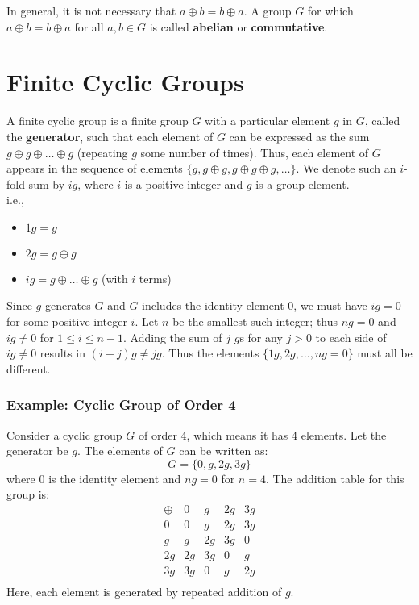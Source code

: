 \documentclass[11pt, letterpaper]{article}
\begin{document}
In general, it is not necessary that \( a \oplus b = b \oplus a \). A group \( G \) for which \( a \oplus b = b \oplus a \) for all \( a, b \in G \) is called \textbf{abelian} or \textbf{commutative}.






\section{Finite Cyclic Groups}

A finite cyclic group is a finite group \( G \) with a particular element \( g \) in \( G \), called the \textbf{generator}, such that each element of \( G \) can be expressed as the sum \( g \oplus g \oplus \ldots \oplus g \) (repeating \( g \) some number of times). Thus, each element of \( G \) appears in the sequence of elements \(\{g, g \oplus g, g \oplus g \oplus g, \ldots\}\). We denote such an \( i \)-fold sum by \( ig \), where \( i \) is a positive integer and \( g \) is a group element.
\\
i.e.,

\begin{itemize}
    \item \( 1g = g \)
    \item \( 2g = g \oplus g \)
    \item \( ig = g \oplus \ldots \oplus g \) (with \( i \) terms)
\end{itemize}

Since \( g \) generates \( G \) and \( G \) includes the identity element \( 0 \), we must have \( ig = 0 \) for some positive integer \( i \). Let \( n \) be the smallest such integer; thus \( ng = 0 \) and \( ig \neq 0 \) for \( 1 \leq i \leq n - 1 \). Adding the sum of \( j \) \( g \)s for any \( j > 0 \) to each side of \( ig \neq 0 \) results in \( (i + j)g \neq jg \). Thus the elements \(\{1g, 2g, \ldots, ng = 0\}\) must all be different.

\subsubsection*{Example: Cyclic Group of Order 4}

Consider a cyclic group \( G \) of order 4, which means it has 4 elements. Let the generator be \( g \). The elements of \( G \) can be written as:
\[
G = \{0, g, 2g, 3g\}
\]
where \( 0 \) is the identity element and \( ng = 0 \) for \( n = 4 \). The addition table for this group is:
\[
\begin{array}{c|cccc}
\oplus & 0 & g & 2g & 3g \\
\hline
0 & 0 & g & 2g & 3g \\
g & g & 2g & 3g & 0 \\
2g & 2g & 3g & 0 & g \\
3g & 3g & 0 & g & 2g \\
\end{array}
\]
Here, each element is generated by repeated addition of \( g \).
\end{document}
